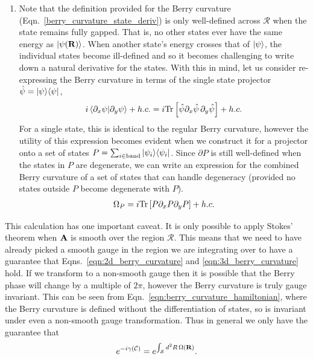 \begin{shaded}
\begin{enumerate}
    \item Note that the definition provided for the Berry curvature  (Eqn.~\ref{berry_curvature_state_deriv}) is only well-defined across $\mathcal R$ when the state remains fully gapped. That is, no other states ever have the same energy as $\ket{\psi(\textbf R)}$. When another state's energy crosses that of $\ket \psi$, the individual states become ill-defined and so it becomes challenging to write down a natural derivative for the states. With this in mind, let us consider re-expressing the Berry curvature in terms of the single state projector $\hat \psi = \ket{\psi}\!\bra{\psi}$,
    \begin{align} \label{eqn:operator_berry_curvature}
        i \braket{  \partial_x \psi | \partial_y \psi} + h.c.
        =
        i \textup{Tr} \left [ \hat \psi \partial_x \hat \psi \, \partial _y \hat \psi \right ] + h.c.
    \end{align} 
    For a single state, this is identical to the regular Berry curvature, however the utility of this expression becomes evident when we construct it for a projector onto a set of states $P = \sum_{i \in \textup{band}} \ket{\psi_i}\!\bra{\psi_i} $. Since $\partial P$ is still well-defined when the states in $P$ are degenerate, we can write an expression for the combined Berry curvature of a set of states that can handle degeneracy (provided no states outside $P$ become degenerate with $P$).
    \begin{align}
        \Omega_P = i\textup{Tr} \left [ P \partial_x P \partial_y P \right ] + h.c.
    \end{align}
\end{enumerate}
\end{shaded}

This calculation has one important caveat. It is only possible to apply Stokes' theorem when $\textbf A$ is smooth over the region $\mathcal{R}$. This means that we need to have already picked a smooth gauge in the region we are integrating over to have a guarantee that Eqns.~\ref{eqn:2d_berry_curvature} and \ref{eqn:3d_berry_curvature} hold. If we transform to a non-smooth gauge then it is possible that the Berry phase will change by a multiple of $2\pi$, however the Berry curvature is truly gauge invariant. This can be seen from Eqn.~\ref{eqn:berry_curvature_hamiltonian}, where the Berry curvature is defined without the differentiation of states, so is invariant under even a non-smooth gauge transformation. Thus in general we only have the guarantee that
\begin{align}\label{eqn:berry_loop_to_curvature}
    e^{-i\gamma(\mathcal C)} = e^{\int_{\mathcal S} d^2 R\,  \Omega (\textbf R)}.
\end{align}
